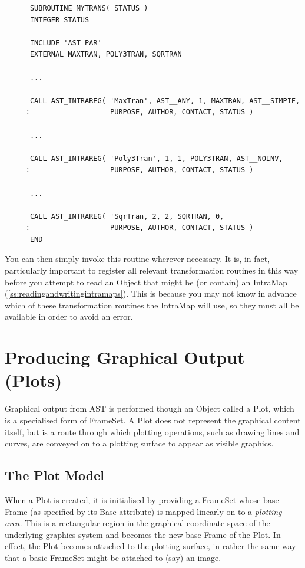 \documentclass[twoside,11pt]{article}
\newcommand{\htmlref}[2]{#1}
\newcommand{\secref}[1]{\S\ref{#1}}
\renewcommand{\secref}[1]{\ref{#1}}
\begin{document}
\small
\begin{verbatim}
      SUBROUTINE MYTRANS( STATUS )
      INTEGER STATUS

      INCLUDE 'AST_PAR'
      EXTERNAL MAXTRAN, POLY3TRAN, SQRTRAN

      ...

      CALL AST_INTRAREG( 'MaxTran', AST__ANY, 1, MAXTRAN, AST__SIMPIF,
     :                   PURPOSE, AUTHOR, CONTACT, STATUS )

      ...

      CALL AST_INTRAREG( 'Poly3Tran', 1, 1, POLY3TRAN, AST__NOINV,
     :                   PURPOSE, AUTHOR, CONTACT, STATUS )

      ...

      CALL AST_INTRAREG( 'SqrTran, 2, 2, SQRTRAN, 0,
     :                   PURPOSE, AUTHOR, CONTACT, STATUS )
      END
\end{verbatim}
\normalsize

You can then simply invoke this routine wherever necessary. It is, in
fact, particularly important to register all relevant transformation
routines in this way before you attempt to read an \htmlref{Object}{Object} that might
be (or contain) an \htmlref{IntraMap}{IntraMap}
(\secref{ss:readingandwritingintramaps}). This is because you may not
know in advance which of these transformation routines the IntraMap
will use, so they must all be available in order to avoid an error.

\cleardoublepage
\section{\label{ss:plots}Producing Graphical Output (Plots)}

Graphical output from AST is performed though an \htmlref{Object}{Object} called a \htmlref{Plot}{Plot},
which is a specialised form of \htmlref{FrameSet}{FrameSet}. A Plot does not represent the
graphical content itself, but is a route through which plotting
operations, such as drawing lines and curves, are conveyed on to a
plotting surface to appear as visible graphics.

\subsection{The Plot Model}

When a \htmlref{Plot}{Plot} is created, it is initialised by providing a \htmlref{FrameSet}{FrameSet}
whose base \htmlref{Frame}{Frame} (as specified by its \htmlref{Base}{Base} attribute) is mapped
linearly on to a {\em{plotting area.}} This is a rectangular region in
the graphical coordinate space of the underlying graphics system and
becomes the new base Frame of the Plot. In effect, the Plot becomes
attached to the plotting surface, in rather the same way that a basic
FrameSet might be attached to (say) an image.
\end{document}
